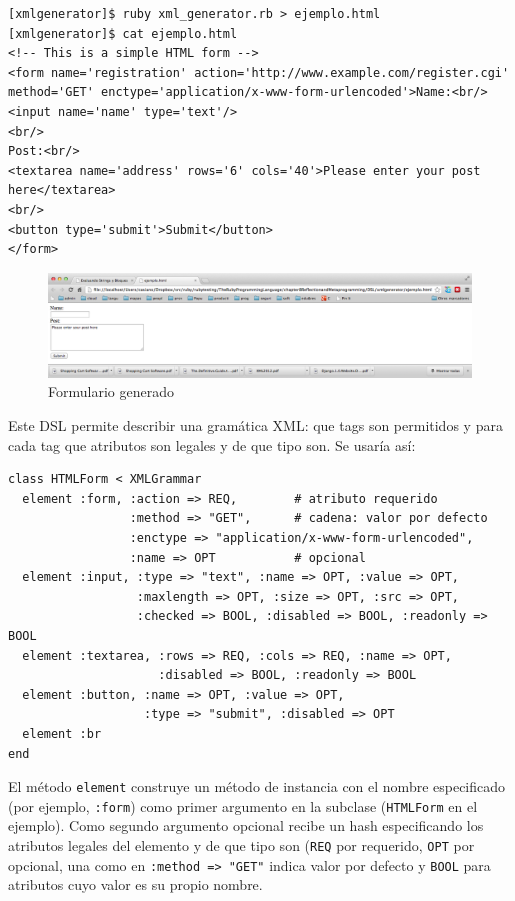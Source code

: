 \begin{verbatim}
[xmlgenerator]$ ruby xml_generator.rb > ejemplo.html
[xmlgenerator]$ cat ejemplo.html 
<!-- This is a simple HTML form -->
<form name='registration' action='http://www.example.com/register.cgi' method='GET' enctype='application/x-www-form-urlencoded'>Name:<br/>
<input name='name' type='text'/>
<br/>
Post:<br/>
<textarea name='address' rows='6' cols='40'>Please enter your post here</textarea>
<br/>
<button type='submit'>Submit</button>
</form>
\end{verbatim}


\begin{figure}[htb]
\begin{center}
\includegraphics[scale=1]{chapter8/form.png}
\end{center}
\label{figure:formulario}
\caption{Formulario generado}
\end{figure}


Este DSL permite describir una gramática XML: que tags son permitidos
y para cada tag que atributos son legales y de que tipo son.
Se usaría así:

\begin{verbatim}
class HTMLForm < XMLGrammar
  element :form, :action => REQ,        # atributo requerido
                 :method => "GET",      # cadena: valor por defecto
                 :enctype => "application/x-www-form-urlencoded",
                 :name => OPT           # opcional
  element :input, :type => "text", :name => OPT, :value => OPT,
                  :maxlength => OPT, :size => OPT, :src => OPT,
                  :checked => BOOL, :disabled => BOOL, :readonly => BOOL
  element :textarea, :rows => REQ, :cols => REQ, :name => OPT,
                     :disabled => BOOL, :readonly => BOOL
  element :button, :name => OPT, :value => OPT,
                   :type => "submit", :disabled => OPT
  element :br
end
\end{verbatim}

El método \verb|element| construye un método de instancia 
con el nombre especificado (por ejemplo, \verb|:form|) como primer
argumento en la subclase (\verb|HTMLForm| en el ejemplo).
Como segundo argumento opcional recibe un hash especificando los atributos 
legales del elemento y de que tipo son (\verb|REQ| por requerido, \verb|OPT| por opcional,
una \String{} como en \verb|:method => "GET"| indica valor por defecto y \verb|BOOL| para atributos
cuyo valor es su propio nombre.

